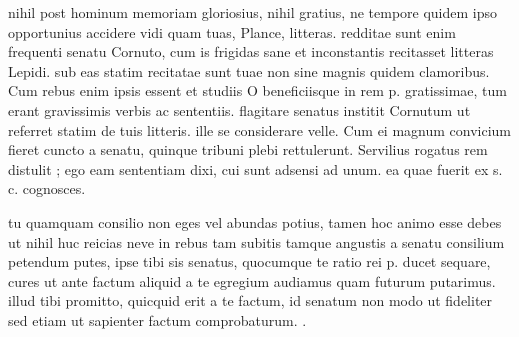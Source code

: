 


 nihil post hominum memoriam gloriosius, nihil gratius, ne tempore quidem ipso opportunius accidere vidi quam tuas, Plance, litteras. redditae sunt enim frequenti senatu Cornuto, cum is frigidas sane et inconstantis recitasset litteras Lepidi. sub eas statim recitatae sunt tuae non sine magnis quidem clamoribus. Cum rebus enim ipsis essent et studiis O beneficiisque in rem p. gratissimae, tum erant gravissimis verbis ac sententiis. flagitare senatus institit Cornutum ut referret statim de tuis litteris. ille se considerare velle. Cum ei magnum convicium fieret cuncto a senatu, quinque tribuni plebi rettulerunt. Servilius rogatus rem distulit ; ego eam sententiam dixi, cui sunt adsensi ad unum. ea quae fuerit ex s. c. cognosces.

 tu quamquam consilio non eges vel abundas potius, tamen hoc animo esse debes ut nihil huc reicias neve in rebus tam subitis tamque angustis a senatu consilium petendum putes, ipse tibi sis senatus, quocumque te ratio rei p. ducet sequare, cures ut ante factum aliquid a te egregium audiamus quam futurum putarimus. illud tibi promitto, quicquid erit a te factum, id senatum non modo ut fideliter sed etiam ut sapienter factum comprobaturum. .
